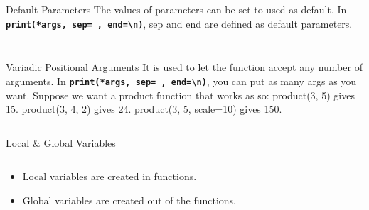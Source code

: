         \begin{frame}{Default Parameters}
            The values of parameters can be set to used as default.
            \newline
            In \textbf{\texttt{print(*args, sep=\textquotesingle \ \textquotesingle, end=\textquotesingle \textbackslash n\textquotesingle )}}, 
            sep and end are defined as default parameters.
            \inputminted[frame=single,framesep=2pt, lastline=15]{python3}{code-examples/default.py}
            \inputminted[frame=single,framesep=2pt, lastline=15]{python3}{code-examples/valid2.py}  
        \end{frame}

        \begin{frame}{Variadic Positional Arguments}
            It is used to let the function accept any number of arguments.
            \newline
            In \textbf{\texttt{print(*args, sep=\textquotesingle \ \textquotesingle, end=\textquotesingle \textbackslash n\textquotesingle )}}, 
            you can put as many args as you want.
            \newline 
            \newline Suppose we want a product function that works as so:
            \newline product(3, 5) gives 15.
            \newline product(3, 4, 2) gives 24.
            \newline product(3, 5, scale=10) gives 150.
            \newline 
            \inputminted[frame=single,framesep=2pt, lastline=15]{python3}{code-examples/variadic.py}
        \end{frame}

        \begin{frame}{Local \& Global Variables}
            \begin{columns}
                \begin{column}{0.50\textwidth}
                    \begin{itemize}
                        \item Local variables are created in functions.
                        \item Global variables are created out of the functions.
                    \end{itemize}
                    \inputminted[frame=single,framesep=2pt, lastline=15]{python3}{code-examples/var.py}
                \end{column}
                \begin{column}{0.50\textwidth}
                    \inputminted[frame=single,framesep=2pt, lastline=15]{python3}{code-examples/var2.py}                    
                    \inputminted[frame=single,framesep=2pt, lastline=15]{python3}{code-examples/var3.py}                    
                \end{column}
            \end{columns}
        \end{frame}

